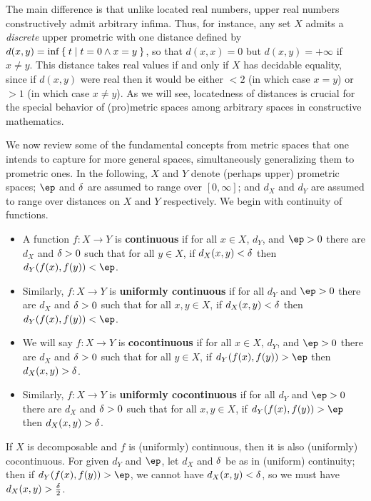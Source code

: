 \documentclass{article}
\def\Rp{[0,\infty]}
\begin{document}
The main difference is that unlike located real numbers, upper real numbers constructively admit arbitrary infima.
Thus, for instance, any set $X$ admits a \emph{discrete} upper prometric with one distance defined by $d(x,y) = \inf \Set{ t | t=0 \land x=y }$, so that $d(x,x)=0$ but $d(x,y)=+\infty$ if $x\neq y$.
This distance takes real values if and only if $X$ has decidable equality, since if $d(x,y)$ were real then it would be either $<2$ (in which case $x=y$) or $>1$ (in which case $x\neq y$).
As we will see, locatedness of distances is crucial for the special behavior of (pro)metric spaces among arbitrary spaces in constructive mathematics.

We now review some of the fundamental concepts from metric spaces that one intends to capture for more general spaces, simultaneously generalizing them to prometric ones.
In the following, $X$ and $Y$ denote (perhaps upper) prometric spaces; $\ep$ and $\delta$ are assumed to range over $\Rp$; and $d_X$ and $d_Y$ are assumed to range over distances on $X$ and $Y$ respectively.
We begin with continuity of functions.

\begin{itemize}
\item A function $f:X\to Y$ is \textbf{continuous} if for all $x\in X$, $d_Y$, and $\ep>0$ there are $d_X$ and $\delta>0$ such that for all $y\in X$, if $d_X(x,y)<\delta$ then $d_Y(f(x),f(y))<\ep$.
\item Similarly, $f:X\to Y$ is \textbf{uniformly continuous} if for all $d_Y$ and $\ep>0$ there are $d_X$ and $\delta>0$ such that for all $x,y\in X$, if $d_X(x,y)<\delta$ then $d_Y(f(x),f(y))<\ep$.
\item We will say $f:X\to Y$ is \textbf{cocontinuous} if for all $x\in X$, $d_Y$, and $\ep>0$ there are $d_X$ and $\delta>0$ such that for all $y\in X$, if $d_Y(f(x),f(y))>\ep$ then $d_X(x,y)>\delta$.
\item Similarly, $f:X\to Y$ is \textbf{uniformly cocontinuous} if for all $d_Y$ and $\ep>0$ there are $d_X$ and $\delta>0$ such that for all $x,y\in X$, if $d_Y(f(x),f(y))>\ep$ then $d_X(x,y)>\delta$.
\end{itemize}

If $X$ is decomposable and $f$ is (uniformly) continuous, then it is also (uniformly) cocontinuous.
For given $d_Y$ and $\ep$, let $d_X$ and $\delta$ be as in (uniform) continuity; then if $d_Y(f(x),f(y)) > \ep$, we cannot have $d_X(x,y) < \delta$, so we must have $d_X(x,y) > \frac{\delta}{2}$.
\end{document}
